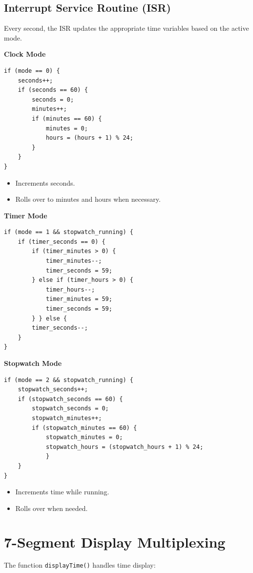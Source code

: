 \documentclass[a4paper,12pt]{article}
\begin{document}
\subsection*{Interrupt Service Routine (ISR)}

Every second, the ISR updates the appropriate time variables based on the active mode.

\textbf{Clock Mode}

\begin{lstlisting}
if (mode == 0) {
    seconds++;
    if (seconds == 60) {
        seconds = 0;
        minutes++;
        if (minutes == 60) {
            minutes = 0;
            hours = (hours + 1) % 24;
        }
    }
}
\end{lstlisting}
\begin{itemize}
    \item Increments seconds.
    \item Rolls over to minutes and hours when necessary.
\end{itemize}

\textbf{Timer Mode}

\begin{lstlisting}
if (mode == 1 && stopwatch_running) {  
    if (timer_seconds == 0) {
        if (timer_minutes > 0) {
            timer_minutes--;
            timer_seconds = 59;
        } else if (timer_hours > 0) {
            timer_hours--;
            timer_minutes = 59;
            timer_seconds = 59;
        } } else {
        timer_seconds--;
    }
}
\end{lstlisting}

\textbf{Stopwatch Mode}

\begin{lstlisting}
if (mode == 2 && stopwatch_running) {
    stopwatch_seconds++;
    if (stopwatch_seconds == 60) {
        stopwatch_seconds = 0;
        stopwatch_minutes++;
        if (stopwatch_minutes == 60) {
            stopwatch_minutes = 0;
            stopwatch_hours = (stopwatch_hours + 1) % 24;
            }
    }
}
\end{lstlisting}

\begin{itemize}
    \item Increments time while running.
    \item Rolls over when needed.
\end{itemize}

\section*{7-Segment Display Multiplexing}
The function \texttt{displayTime()} handles time display:
\end{document}
